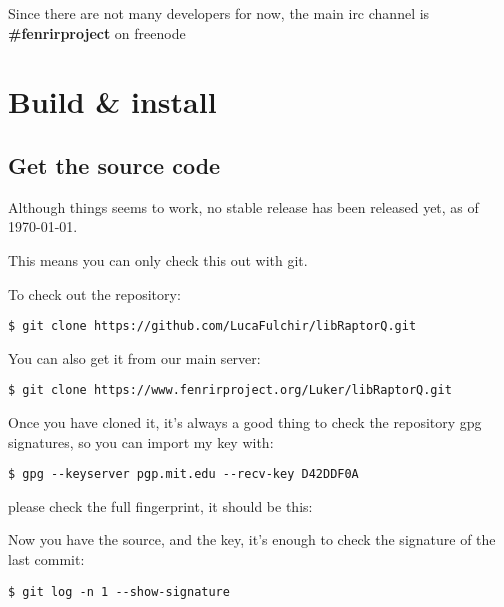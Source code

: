 \documentclass[11pt,a4paper]{refart}
\begin{document}
 Since there are not many developers for now, the main irc channel is \textbf{\#fenrirproject} on freenode


\section{Build \& install}
\subsection{Get the source code}
Although things seems to work, no stable release has been released yet, as of \today.

This means you can only check this out with git.

To check out the repository:

\begin{verbatim}
$ git clone https://github.com/LucaFulchir/libRaptorQ.git
\end{verbatim}

You can also get it from our main server:

\begin{verbatim}
$ git clone https://www.fenrirproject.org/Luker/libRaptorQ.git
\end{verbatim}

Once you have cloned it, it's always a good thing to check the repository gpg
signatures, so you can import my key with:

\begin{verbatim}
$ gpg --keyserver pgp.mit.edu --recv-key D42DDF0A
\end{verbatim}

please check the full fingerprint, it should be this:

\theverbbox
 

Now you have the source, and the key, it's enough to check the signature of the
last commit:

\begin{verbatim}
$ git log -n 1 --show-signature
\end{verbatim}
\end{document}
